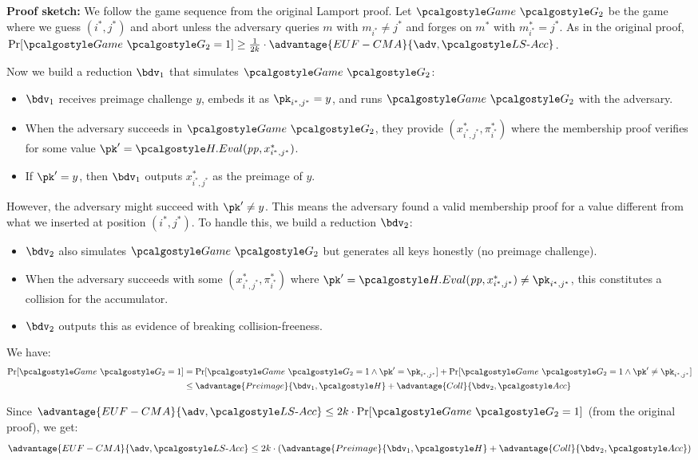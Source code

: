 \begin{mysolution}
\begin{enumerate}
    \textbf{Proof sketch:}
    We follow the game sequence from the original Lamport proof.
    Let $\Game~\algo{G_2}$ be the game where we guess $(i^*, j^*)$ and abort unless the adversary queries $m$ with $m_{i^*} \neq j^*$ and forges on $m^*$ with $m^*_{i^*} = j^*$.
    As in the original proof, $\Pr[\Game~\algo{G_2} = 1] \geq \frac{1}{2k} \cdot \advantage{EUF-CMA}{\adv, \algo{LS\text{-}Acc}}$.
    
    Now we build a \ppt reduction $\bdv_1$ that simulates $\Game~\algo{G_2}$:
    \begin{itemize}
      \item $\bdv_1$ receives preimage challenge $y$, embeds it as $\pk_{i^*,j^*} = y$, and runs $\Game~\algo{G_2}$ with the adversary.
      \item When the adversary succeeds in $\Game~\algo{G_2}$, they provide $(x^*_{i^*,j^*}, \pi^*_{i^*})$ where the membership proof verifies for some value $\pk' = \algo{H.Eval}(\params, x^*_{i^*,j^*})$.
      \item If $\pk' = y$, then $\bdv_1$ outputs $x^*_{i^*,j^*}$ as the preimage of $y$.
    \end{itemize}
    
    However, the adversary might succeed with $\pk' \neq y$.
    This means the adversary found a valid membership proof for a value different from what we inserted at position $(i^*, j^*)$.
    To handle this, we build a \ppt reduction $\bdv_2$:
    \begin{itemize}
      \item $\bdv_2$ also simulates $\Game~\algo{G_2}$ but generates all keys honestly (no preimage challenge).
      \item When the adversary succeeds with some $(x^*_{i^*,j^*}, \pi^*_{i^*})$ where $\pk' = \algo{H.Eval}(\params, x^*_{i^*,j^*}) \neq \pk_{i^*,j^*}$, this constitutes a collision for the accumulator.
      \item $\bdv_2$ outputs this as evidence of breaking collision-freeness.
    \end{itemize}
    
    We have:
    \begin{align*}
      \Pr[\Game~\algo{G_2} = 1] &= \Pr[\Game~\algo{G_2} = 1 \wedge \pk' = \pk_{i^*,j^*}] + \Pr[\Game~\algo{G_2} = 1 \wedge \pk' \neq \pk_{i^*,j^*}]\\
      &\leq \advantage{Preimage}{\bdv_1, \algo{H}} + \advantage{Coll}{\bdv_2, \algo{Acc}}
    \end{align*}
    
    Since $\advantage{EUF-CMA}{\adv, \algo{LS\text{-}Acc}} \leq 2k \cdot \Pr[\Game~\algo{G_2} = 1]$ (from the original proof), we get:
    \[
      \advantage{EUF-CMA}{\adv, \algo{LS\text{-}Acc}} \leq 2k \cdot (\advantage{Preimage}{\bdv_1, \algo{H}} + \advantage{Coll}{\bdv_2, \algo{Acc}})
    \]
  \end{enumerate}
\end{mysolution}
\fi

